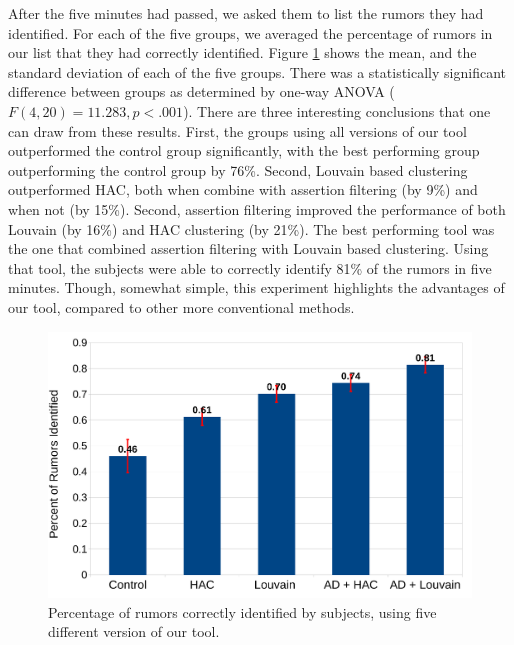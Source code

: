 \documentclass[letterpaper]{article}
\begin{document}
After the five minutes had passed, we asked them to list the rumors they had identified. For each of the five groups, we averaged the percentage of rumors in our list that they had correctly identified. Figure \ref{fig:res1} shows the mean, and the standard deviation of each of the five groups. There was a statistically significant difference between groups as determined by one-way ANOVA ($F(4,20) = 11.283, p < .001$). There are three interesting conclusions that one can draw from these results. First, the groups using all versions of our tool outperformed the control group significantly, with the best performing group outperforming the control group by 76\%. Second, Louvain based clustering outperformed HAC, both when combine with assertion filtering (by 9\%) and when not (by 15\%). Second, assertion filtering improved the performance of both Louvain (by 16\%) and HAC clustering (by 21\%). The best performing tool was the one that combined assertion filtering with Louvain based clustering. Using that tool, the subjects were able to correctly identify 81\% of the rumors in five minutes. Though, somewhat simple, this experiment highlights the advantages of our tool, compared to other more conventional methods.




\begin{figure}[htb]
\centering
\includegraphics[width=.80\columnwidth]{rd_eval_nt.pdf}
\caption{Percentage of rumors correctly identified by subjects, using five different version of our tool.}
\label{fig:res1}
\end{figure}

\end{document}
